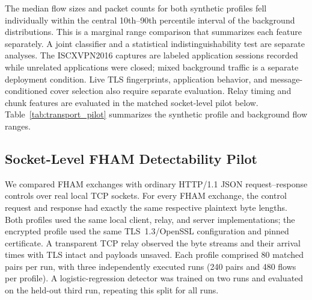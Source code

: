 \documentclass[preprint,12pt]{elsarticle}
\theoremstyle{plain}
\providecommand{\DIFaddtex}[1]{{\protect\color{blue} \sf #1}} %
\providecommand{\DIFdeltex}[1]{{\protect\color{red} \scriptsize #1}} %
\providecommand{\DIFaddbegin}{} %
\providecommand{\DIFaddend}{} %
\providecommand{\DIFdelbegin}{} %
\providecommand{\DIFdelend}{} %
\providecommand{\DIFadd}[1]{\texorpdfstring{\DIFaddtex{#1}}{#1}} %
\providecommand{\DIFdel}[1]{\texorpdfstring{\DIFdeltex{#1}}{}} %
\providecommand{\DIFscaledelfig}{0.5}
\newlength{\DIFdelgraphicswidth} %
\newlength{\DIFdelgraphicsheight} %
\providecommand{\DIFaddincludegraphics}[2][]{{\color{blue}\fbox{\DIFOincludegraphics[#1]{#2}}}} %
\providecommand{\DIFdelincludegraphics}[2][]{%
\sbox{\DIFdelgraphicsbox}{\DIFOincludegraphics[#1]{#2}}%
\settoboxwidth{\DIFdelgraphicswidth}{\DIFdelgraphicsbox} %
\settoboxtotalheight{\DIFdelgraphicsheight}{\DIFdelgraphicsbox} %
\scalebox{\DIFscaledelfig}{%
\parbox[b]{\DIFdelgraphicswidth}{\usebox{\DIFdelgraphicsbox}\\[-\baselineskip] \rule{\DIFdelgraphicswidth}{0em}}\llap{\resizebox{\DIFdelgraphicswidth}{\DIFdelgraphicsheight}{%
\setlength{\unitlength}{\DIFdelgraphicswidth}%
\begin{picture}(1,1)%
\thicklines\linethickness{2pt} %
{\color[rgb]{1,0,0}\put(0,0){\framebox(1,1){}}}%
{\color[rgb]{1,0,0}\put(0,0){\line( 1,1){1}}}%
{\color[rgb]{1,0,0}\put(0,1){\line(1,-1){1}}}%
\end{picture}%
}\hspace*{3pt}}} %
} %
\DeclareRobustCommand{\DIFaddbegin}{\DIFOaddbegin \let\includegraphics\DIFaddincludegraphics} %
\DeclareRobustCommand{\DIFaddend}{\DIFOaddend \let\includegraphics\DIFOincludegraphics} %
\DeclareRobustCommand{\DIFdelbegin}{\DIFOdelbegin \let\includegraphics\DIFdelincludegraphics} %
\DeclareRobustCommand{\DIFdelend}{\DIFOaddend \let\includegraphics\DIFOincludegraphics} %
\renewcommand{\DIFdel}[1]{}
\renewcommand{\DIFdelincludegraphics}[2][]{}
\begin{document}
The median flow sizes and packet counts for both synthetic profiles fell
individually within the central 10th--90th percentile interval of the
background distributions. This is a marginal range comparison \DIFdelbegin \DIFdel{: it does not
combine features into a classifier and does not establish that the positive
flows are statistically indistinguishable from ordinary traffic. In
particular, the }\DIFdelend \DIFaddbegin \DIFadd{that summarizes each feature separately.
A joint classifier and a statistical indistinguishability test are separate
analyses. The }\DIFaddend ISCXVPN2016 captures are labeled application sessions recorded
\DIFdelbegin \DIFdel{with unrelated applications closed, rather than }\DIFdelend \DIFaddbegin \DIFadd{while unrelated applications were closed; }\DIFaddend mixed background traffic \DIFdelbegin \DIFdel{.
This capture-feature comparison does not assess live }\DIFdelend \DIFaddbegin \DIFadd{is a
separate deployment condition. Live }\DIFaddend TLS fingerprints, application behavior,
\DIFdelbegin \DIFdel{or selection effects from }\DIFdelend \DIFaddbegin \DIFadd{and }\DIFaddend message-conditioned cover \DIFdelbegin \DIFdel{choice}\DIFdelend \DIFaddbegin \DIFadd{selection also require separate evaluation}\DIFaddend . Relay timing and chunk features are evaluated in the matched
socket-level pilot below. Table~\ref{tab:transport_pilot} summarizes the
synthetic profile and background flow ranges.

\begin{table}[H]
\centering
\small
\caption{Synthetic positive-flow transport pilot and marginal comparison with reassembled non-VPN TCP flows.}
\label{tab:transport_pilot}

\end{table}

\subsection{Socket-Level FHAM Detectability Pilot}

We compared FHAM exchanges with ordinary HTTP/1.1 JSON request--response
controls over real local TCP sockets. For every FHAM exchange, the control
request and response had exactly the same respective plaintext byte lengths.
Both profiles used the same local client, relay, and server implementations;
the encrypted profile used the same TLS~1.3/OpenSSL configuration and pinned
certificate.
A transparent TCP relay observed the byte streams and their arrival times
\DIFdelbegin \DIFdel{without terminating TLS or saving payloads }\DIFdelend \DIFaddbegin \DIFadd{with TLS intact and payloads unsaved}\DIFaddend . Each profile comprised 80 matched
pairs per run, with three independently executed runs (240 pairs and 480
flows per profile). A logistic-regression detector was trained on two runs
and evaluated on the held-out third run, repeating this split for all runs.
\end{document}
